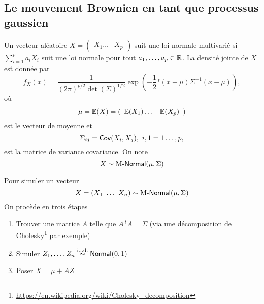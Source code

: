 \subsection{Le mouvement Brownien en tant que processus gaussien}
\begin{definition}
Un vecteur aléatoire $X = (\begin{array}{ccc}X_1\ldots &X_p\end{array})$ suit une loi normale multivarié si $\sum_{i=1}^pa_iX_i$ suit une loi normale pour tout $a_1,\ldots, a_p\in \mathbb{R}$. La densité jointe de $X$ est donnée par 
$$
f_X(x) = \frac{1}{(2\pi)^{p/2}\det(\Sigma)^{1/2}}\exp\left(-\frac{1}{2}\,^t(x-\mu)\Sigma^{-1}(x-\mu)\right),
$$
où
$$
\mu = \mathbb{E}(X) = (\begin{array}{ccc}\mathbb{E}(X_1)\ldots &\mathbb{E}(X_p)\end{array})
$$
est le vecteur de moyenne et 
$$
\Sigma_{ij} =\mathsf{Cov}(X_i, X_j),\text{ }i,1 = 1\ldots, p, 
$$
est la matrice de variance covariance. On note 
$$
X \sim\text{M-}\mathsf{Normal}(\mu,\Sigma)
$$
\end{definition}
\begin{remark}
Pour simuler un vecteur 
$$
X = (X_1\text{ }\ldots\text{ } X_n) \sim\text{M-}\mathsf{Normal}(\mu,\Sigma)
$$
On procède en trois étapes
\begin{enumerate}
  \item Trouver une matrice $A$ telle que $A \,^tA = \Sigma$ (via une décomposition de Cholesky\footnote{\url{https://en.wikipedia.org/wiki/Cholesky_decomposition}} par exemple)
  \item Simuler $Z_1,\ldots, Z_n\overset{\text{\iid}}{\sim}\NormalDist(0,1)$
  \item Poser $X = \mu + AZ$
\end{enumerate}
\end{remark}
